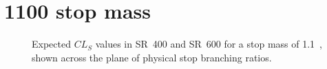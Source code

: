 \FloatBarrier

\newpage
\section{1100 \texorpdfstring{\GeV}{GeV} stop mass}

\begin{figure}[ht]
  \centering
  \caption{
    Expected $CL_S$ values in SR~400 and SR~600 for a stop mass of 1.1~\TeV,
    shown across the plane of physical stop branching ratios.
  }
\end{figure}

